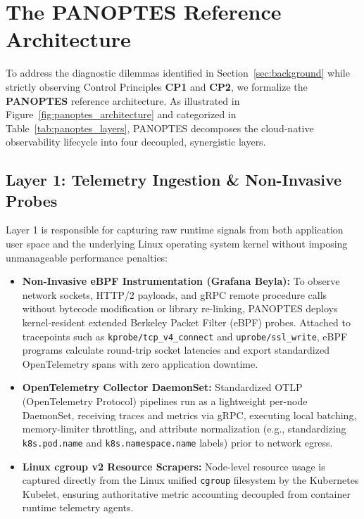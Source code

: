 \section{The PANOPTES Reference Architecture}
\label{sec:panoptes_architecture}

To address the diagnostic dilemmas identified in Section~\ref{sec:background} while strictly observing Control Principles \textbf{CP1} and \textbf{CP2}, we formalize the \textbf{PANOPTES} reference architecture. As illustrated in Figure~\ref{fig:panoptes_architecture} and categorized in Table~\ref{tab:panoptes_layers}, PANOPTES decomposes the cloud-native observability lifecycle into four decoupled, synergistic layers.




\subsection{Layer 1: Telemetry Ingestion \& Non-Invasive Probes}
Layer 1 is responsible for capturing raw runtime signals from both application user space and the underlying Linux operating system kernel without imposing unmanageable performance penalties:
\begin{itemize}[leftmargin=1.2em, itemsep=2pt, topsep=3pt]
    \item \textbf{Non-Invasive eBPF Instrumentation (Grafana Beyla):} To observe network sockets, HTTP/2 payloads, and gRPC remote procedure calls without bytecode modification or library re-linking, PANOPTES deploys kernel-resident extended Berkeley Packet Filter (eBPF) probes. Attached to tracepoints such as \texttt{kprobe/tcp\_v4\_connect} and \texttt{uprobe/ssl\_write}, eBPF programs calculate round-trip socket latencies and export standardized OpenTelemetry spans with zero application downtime.
    \item \textbf{OpenTelemetry Collector DaemonSet:} Standardized OTLP (OpenTelemetry Protocol) pipelines run as a lightweight per-node DaemonSet, receiving traces and metrics via gRPC, executing local batching, memory-limiter throttling, and attribute normalization (e.g., standardizing \texttt{k8s.pod.name} and \texttt{k8s.namespace.name} labels) prior to network egress.
    \item \textbf{Linux cgroup v2 Resource Scrapers:} Node-level resource usage is captured directly from the Linux unified \texttt{cgroup} filesystem by the Kubernetes Kubelet, ensuring authoritative metric accounting decoupled from container runtime telemetry agents.
\end{itemize}

